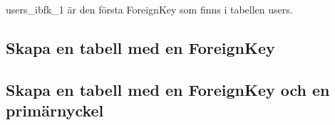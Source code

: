 users\_ibfk\_1 är den första ForeignKey som finns i tabellen users.

\hypertarget{skapa-en-tabell-med-en-foreignkey}{%
\subsection{Skapa en tabell med en
ForeignKey}\label{skapa-en-tabell-med-en-foreignkey}}

\hypertarget{cb6}{}
\begin{Shaded}
\begin{Highlighting}[]
    
\NormalTok{(} \NormalTok{,}
\NormalTok{(}\NormalTok{) } \NormalTok{,}
\NormalTok{(}\NormalTok{),}
\NormalTok{(}
 \NormalTok{)}
\NormalTok{);}
\end{Highlighting}
\end{Shaded}

\hypertarget{skapa-en-tabell-med-en-foreignkey-och-en-primuxe4rnyckel}{%
\subsection{Skapa en tabell med en ForeignKey och en
primärnyckel}\label{skapa-en-tabell-med-en-foreignkey-och-en-primuxe4rnyckel}}

\hypertarget{cb7}{}
\begin{Shaded}
\begin{Highlighting}[]
    
\NormalTok{(} \NormalTok{,}
\NormalTok{(}\NormalTok{) } \NormalTok{,}
\NormalTok{(}\NormalTok{),}
\NormalTok{(}
 
 \NormalTok{)}
\NormalTok{);}
\end{Highlighting}
\end{Shaded}

